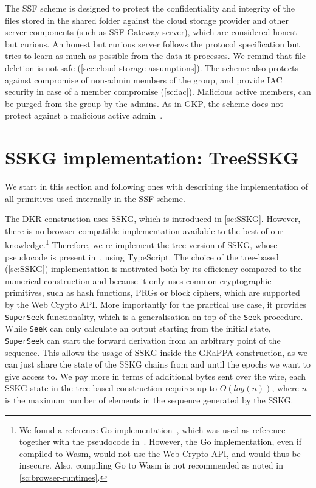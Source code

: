 The SSF scheme is designed to protect the confidentiality and integrity
of the files stored in the shared folder against 
the cloud storage provider and other server components (such as SSF Gateway server), 
which are considered honest but curious.
An honest but curious server follows the protocol specification
but tries to learn as much as possible from the data it processes.
We remind that file deletion is not safe (\cref{scc:cloud-storage-assumptions}).
The scheme also protects against compromise of non-admin
members of the group, and provide IAC security in case
of a member compromise (\cref{sc:iac}).
Malicious active members, can be purged from the group by the admins.
As in GKP, the scheme does not protect against a malicious active admin~\cite{GKP}.


\section{SSKG implementation: TreeSSKG}\label{sc:ssf-sskg}

We start in this section and following ones with describing the
implementation of all primitives used internally in the SSF scheme.

The DKR construction uses SSKG, which is introduced in \cref{sc:SSKG}.
However, there is no browser-compatible implementation available to the best of our knowledge.\footnote{We found a reference Go implementation~\cite{SSKGGo}, which was used as reference together with the pseudocode in~\cite{ESORICS:MarPoe14}. However, the Go implementation, even if compiled to Wasm, would not use the Web Crypto API, and would thus be insecure. Also, compiling Go to Wasm is not recommended as noted in \cref{sc:browser-runtimes}.}
Therefore, we re-implement the tree version of SSKG, whose pseudocode is present in~\cite{ESORICS:MarPoe14}, using TypeScript.
The choice of the tree-based (\cref{sc:SSKG}) implementation is motivated both by its efficiency
compared to the numerical construction and because it only uses common cryptographic
primitives, such as hash functions, PRGs or block ciphers, which are supported by the Web Crypto API.
More importantly for the practical use case, it provides \texttt{SuperSeek}
functionality, which is a generalisation on top of the \texttt{Seek} procedure.
While \texttt{Seek} can only calculate an output starting from the initial state, 
\texttt{SuperSeek} can start the forward derivation from an arbitrary point of the sequence.
This allows the usage of SSKG inside the GRaPPA construction,
as we can just share the state of the SSKG chains from and until
the epochs we want to give access to. 
We pay more in terms of additional bytes sent over the wire, each SSKG
state in the tree-based construction requires up to $O(log(n))$,
where $n$ is the maximum number of elements in the sequence generated by the SSKG.

